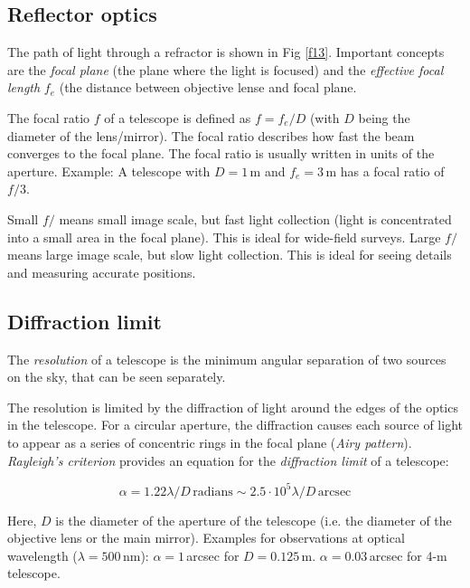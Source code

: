 \subsection{Reflector optics}

The path of light through a refractor is shown in Fig \ref{f13}. Important concepts are the \textit{focal plane} (the plane where the light is focused) and the \textit{effective focal length} $f_e$ (the distance between objective lense and focal plane.

The focal ratio $f$ of a telescope is defined as $f = f_e/D$ (with $D$ being the diameter of the lens/mirror). The focal ratio describes how fast the beam converges to the focal plane. The focal ratio is usually written in units of the aperture. Example: A telescope with $D = 1$\,m and $f_e = 3$\,m has a focal ratio of $f/3$. 

Small $f/$ means small image scale, but fast light collection (light is concentrated into a small area in the focal plane). This is ideal for wide-field surveys. Large $f/$ means large image scale, but slow light collection. This is ideal for seeing details and measuring accurate positions.

\subsection{Diffraction limit}

The \textit{resolution} of a telescope is the minimum angular separation of two sources on the sky, that can be seen separately. 

The resolution is limited by the diffraction of light around the edges of the optics in the telescope. For a circular aperture, the diffraction causes each source of light to appear as a series of concentric rings in the focal plane (\textit{Airy pattern}). \textit{Rayleigh's criterion} provides an equation for the \textit{diffraction limit} of a telescope:

\begin{equation}
\alpha = 1.22 \lambda / D\,\mathrm{radians} \sim 2.5 \cdot 10^5 \lambda / D\,\mathrm{arcsec}
\label{eq22}
\end{equation}

Here, $D$ is the diameter of the aperture of the telescope (i.e. the diameter of the objective lens or the main mirror). Examples for observations at optical wavelength ($\lambda = 500$\,nm): $\alpha = 1$\,arcsec for $D = 0.125$\,m. $\alpha = 0.03$\,arcsec for 4-m telescope.




